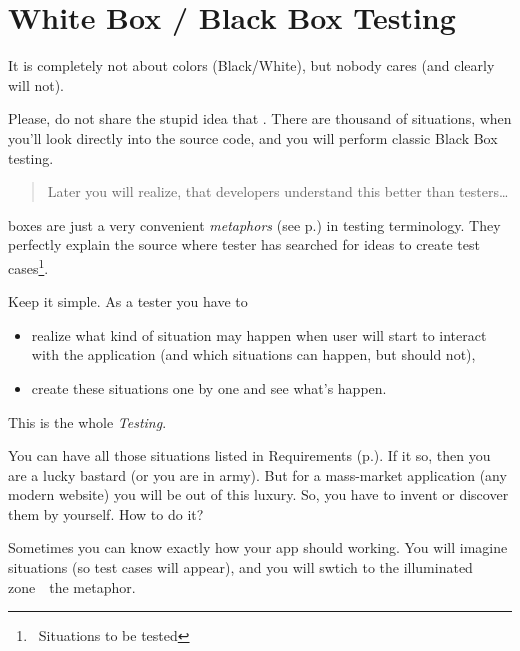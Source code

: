 \section{White Box / Black Box Testing}
\label{sec:White Box Black Box Testing}

It is completely not about colors (Black/White), but nobody cares (and clearly will not).

Please, do not share the stupid idea that . There are thousand of situations, when you'll look directly into the source code, and you will perform classic Black Box testing.

\begin{quote}
 Later you will realize, that developers understand this  better than testers\ldots
\end{quote} 

  boxes are just a very convenient \emph{metaphors} (see p.\pageref{sec:Metaphor}) in testing terminology. They perfectly explain the source where tester has searched for ideas to create test cases\footnote{~Situations to be tested}.

Keep it simple.  As a tester you have to 
\begin{itemize}
\item 
realize what kind of situation may happen when user will start to interact with the application (and which situations can happen, but should not), 
\item 
create these situations one by one and see what's happen.                                                                                                                                                                                                              \end{itemize}

This is the whole \emph{Testing}.

You can have all those situations listed in Requirements (p.\pageref{sec:Requirement}). If it so, then you are a lucky bastard (or you are in army). But for a mass-market application (any modern website) you will be out of this luxury. So, you have to invent or discover them by yourself. How to do it?

Sometimes you can know exactly how your app should working. You will imagine situations (so test cases will appear), and you will swtich to the illuminated zone~\textemdash~the  metaphor.

